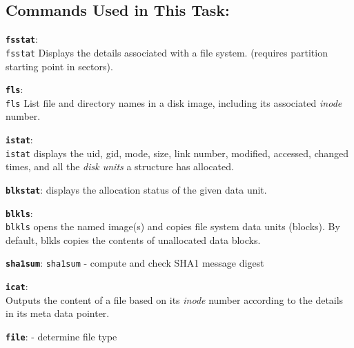 \documentclass[a4paper,11pt]{article}
\begin{document}
\subsection*{Commands Used in This Task:}
\begin{itemize*}
	\item \textbf{\texttt{fsstat}}:\\ \texttt{fsstat} Displays the details associated with a file system. (requires partition starting point in sectors).
	\item \textbf{\texttt{fls}}:\\ \texttt{fls} List file and directory names in a disk image, including its associated \textit{inode} number.
	\item \textbf{\texttt{istat}}:\\ \texttt{istat}  displays the uid, gid, mode, size, link number, modified, accessed, changed times, and all the \textit{disk units} a structure has allocated.
	\item \textbf{\texttt{blkstat}}: displays the allocation status of the given data unit. 
	\item \textbf{\texttt{blkls}}:\\ \texttt{blkls} opens  the named image(s) and copies file system data units (blocks).  By default, blkls copies the contents of unallocated data blocks.
	\item \textbf{\texttt{sha1sum}}: \texttt{sha1sum}	- compute and check SHA1 message digest
	
	\item \textbf{\texttt{icat}}: \\  Outputs the content of a file based on its \textit{inode} number according to the details in its meta data pointer.
	
	\item \textbf{\texttt{file}}:  - determine file type
\end{itemize*}
\end{document}
